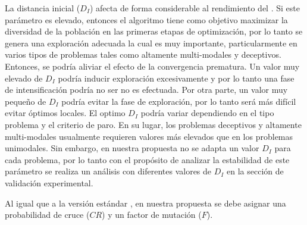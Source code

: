 La distancia inicial ($D_I$) afecta de forma considerable al rendimiento del \DEEDM{}.
%
Si este parámetro es elevado, entonces el algoritmo tiene como objetivo maximizar la diversidad de la población en las primeras etapas de optimización, por lo tanto se genera una exploración adecuada la cual es muy importante, particularmente en varios tipos de problemas tales como altamente multi-modales y deceptivos.
%
Entonces, se podría aliviar el efecto de la convergencia prematura.
%
Un valor muy elevado de $D_I$ podría inducir exploración excesivamente y por lo tanto una fase de intensificación podría no ser no es efectuada.
%
Por otra parte, un valor muy pequeño de $D_I$ podría evitar la fase de exploración, por lo tanto será más difícil evitar óptimos locales.
%
El optimo $D_I$ podría variar dependiendo en el tipo problema y el criterio de paro.
%
En su lugar, los problemas deceptivos y altamente multi-modales usualmente requieren valores más elevados que en los problemas unimodales.
%
Sin embargo, en nuestra propuesta no se adapta un valor $D_I$ para cada problema, por lo tanto con el propósito de analizar la estabilidad de este parámetro se realiza un análisis con diferentes valores de $D_I$ en la sección de validación experimental.
%

%
Al igual que a la versión estándar \DE{}, en nuestra propuesta \DEEDM{} se debe asignar una probabilidad de cruce ($CR$) y un factor de mutación ($F$).

